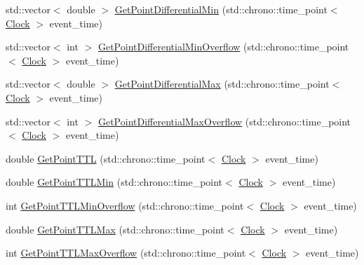 \begin{DoxyCompactItemize}
\item 
std\+::vector$<$ double $>$ \mbox{\hyperlink{class_point_a782860849006b601600f8df15af23f7a}{Get\+Point\+Differential\+Min}} (std\+::chrono\+::time\+\_\+point$<$ \mbox{\hyperlink{universe_8h_a0ef8d951d1ca5ab3cfaf7ab4c7a6fd80}{Clock}} $>$ event\+\_\+time)
\item 
std\+::vector$<$ int $>$ \mbox{\hyperlink{class_point_adbc225afbd532763617db1acdb81ef4c}{Get\+Point\+Differential\+Min\+Overflow}} (std\+::chrono\+::time\+\_\+point$<$ \mbox{\hyperlink{universe_8h_a0ef8d951d1ca5ab3cfaf7ab4c7a6fd80}{Clock}} $>$ event\+\_\+time)
\item 
std\+::vector$<$ double $>$ \mbox{\hyperlink{class_point_a326cd5742e908f8fb3cf6f3275b5462c}{Get\+Point\+Differential\+Max}} (std\+::chrono\+::time\+\_\+point$<$ \mbox{\hyperlink{universe_8h_a0ef8d951d1ca5ab3cfaf7ab4c7a6fd80}{Clock}} $>$ event\+\_\+time)
\item 
std\+::vector$<$ int $>$ \mbox{\hyperlink{class_point_a2d38599722fbf65afe2b9ac57b0c4bcf}{Get\+Point\+Differential\+Max\+Overflow}} (std\+::chrono\+::time\+\_\+point$<$ \mbox{\hyperlink{universe_8h_a0ef8d951d1ca5ab3cfaf7ab4c7a6fd80}{Clock}} $>$ event\+\_\+time)
\item 
double \mbox{\hyperlink{class_point_a72cf99a391fc3d6ea8f4252f4f92c19f}{Get\+Point\+T\+TL}} (std\+::chrono\+::time\+\_\+point$<$ \mbox{\hyperlink{universe_8h_a0ef8d951d1ca5ab3cfaf7ab4c7a6fd80}{Clock}} $>$ event\+\_\+time)
\item 
double \mbox{\hyperlink{class_point_a272b99a9cd054b09c8944b9f0e657890}{Get\+Point\+T\+T\+L\+Min}} (std\+::chrono\+::time\+\_\+point$<$ \mbox{\hyperlink{universe_8h_a0ef8d951d1ca5ab3cfaf7ab4c7a6fd80}{Clock}} $>$ event\+\_\+time)
\item 
int \mbox{\hyperlink{class_point_a72b222f880df30ebcc12ddc1a6d430b5}{Get\+Point\+T\+T\+L\+Min\+Overflow}} (std\+::chrono\+::time\+\_\+point$<$ \mbox{\hyperlink{universe_8h_a0ef8d951d1ca5ab3cfaf7ab4c7a6fd80}{Clock}} $>$ event\+\_\+time)
\item 
double \mbox{\hyperlink{class_point_a0800eea77109f6fbb1220b4d551a70d3}{Get\+Point\+T\+T\+L\+Max}} (std\+::chrono\+::time\+\_\+point$<$ \mbox{\hyperlink{universe_8h_a0ef8d951d1ca5ab3cfaf7ab4c7a6fd80}{Clock}} $>$ event\+\_\+time)
\item 
int \mbox{\hyperlink{class_point_a61d7e0fb0fd0280f628ea46609082809}{Get\+Point\+T\+T\+L\+Max\+Overflow}} (std\+::chrono\+::time\+\_\+point$<$ \mbox{\hyperlink{universe_8h_a0ef8d951d1ca5ab3cfaf7ab4c7a6fd80}{Clock}} $>$ event\+\_\+time)

\end{DoxyCompactItemize}
